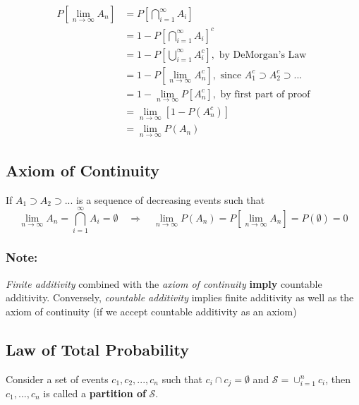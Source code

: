 \documentclass{article}
\begin{document}
\begin{equation*}
    \begin{split}
        P\left[\lim_{n\to\infty} A_n \right] &= P\left[\bigcap_{i=1}^\infty A_i \right]\\
        &= 1- P\left[\bigcap_{i=1}^\infty A_i \right]^c\\
        &= 1- P\left[\bigcup_{i=1}^\infty A_i^c \right], \text{ by DeMorgan's Law}\\
        &= 1 - P\left[\lim_{n\to\infty} A_n^c \right], \text{ since } A_1^c \supset A_2^c \supset ...\\
        &= 1 - \lim_{n\to\infty} P \left[ A^c_n \right], \text{ by first part of proof}\\
        &= \lim_{n\to\infty} \left[ 1 - P(A_n^c) \right] \\
        &= \lim_{n\to\infty} P(A_n)
    \end{split}
\end{equation*}

\subsection{Axiom of Continuity}

If $A_1 \supset A_2 \supset ...$ is a sequence of decreasing events such that
\begin{equation*}
    \lim_{n\to\infty} A_n = \bigcap_{i=1}^\infty A_i = \emptyset \quad \Rightarrow \quad \lim_{n\to\infty} P(A_n) = P\left[\lim_{n\to\infty} A_n \right] = P(\emptyset) = 0
\end{equation*}

\subsubsection*{Note:}

\textit{Finite additivity} combined with the \textit{axiom of continuity} \textbf{imply} countable additivity. Conversely, \textit{countable additivity} implies finite additivity as well as the axiom of continuity (if we accept countable additivity as an axiom)

\subsection{Law of Total Probability}

Consider a set of events $c_1, c_2, ..., c_n$ such that $c_i \cap c_j = \emptyset$ and $\mathcal{S} = \cup_{i=1}^n c_i$, then $c_1, ..., c_n$ is called a \textbf{partition of} $\mathcal{S}$.
\end{document}
